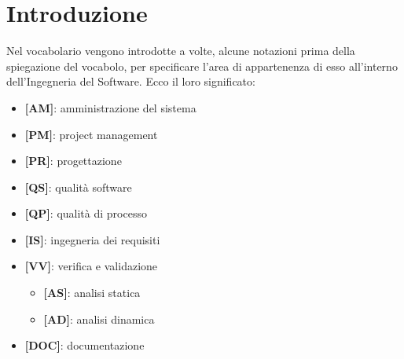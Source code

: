 %
%
%

\section{Introduzione} %
\label{sec:introduzione}
Nel vocabolario vengono introdotte a volte, alcune notazioni prima della spiegazione del vocabolo, per specificare l'area di appartenenza di esso all'interno dell'Ingegneria del Software. Ecco il loro significato:
	\begin{itemize}
		\item \textbf{[AM]}: amministrazione del sistema
		\item \textbf{[PM]}: project management
		\item \textbf{[PR]}: progettazione
		\item \textbf{[QS]}: qualità software
		\item \textbf{[QP]}: qualità di processo
		\item \textbf{[IS]}: ingegneria dei requisiti
		\item \textbf{[VV]}: verifica e validazione
			\begin{itemize}
				\item \textbf{[AS]}: analisi statica
				\item \textbf{[AD]}: analisi dinamica
			\end{itemize}
		\item \textbf{[DOC]}: documentazione
	\end{itemize}
